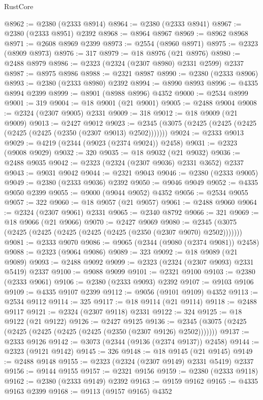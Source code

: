 \begin{lexlean}{RustCore}
\begin{coremodule}
@8962 := @2380 (@2333 @8914)
@8964 := @2380 (@2333 @8941)
@8967 := @2380 (@2333 @8951) @2392
@8968 := @8964 @8967
@8969 := @8962 @8968
@8971 := @2608 @8969 @2399
@8973 := @2554 (@8960 @8971)
@8975 := @2323 (@8909 @8973)
@8976 := 317
@8979 := @18 @8976 (@21 @8976)
@8980 := @2488 @8979
@8986 := @2323 (@2324 (@2307 @8980) @2331 @2599) @2337
@8987 := @8975 @8986
@8988 := @2321 @8987
@8990 := @2380 (@2333 @8906)
@8993 := @2380 (@2333 @8980) @2392
@8994 := @8990 @8993
@8996 := @4335 @8994 @2399
@8999 := @8901 (@8988 @8996) @4352
@9000 := @2534 @8999
@9001 := 319
@9004 := @18 @9001 (@21 @9001)
@9005 := @2488 @9004
@9008 := @2324 (@2307 @9005) @2331
@9009 := 318
@9012 := @18 @9009 (@21 @9009)
@9013 := @2427 @9012
@9023 := @2345 (@3075 (@2425 (@2425 (@2425 (@2425 (@2425 (@2350 (@2307 @9013) @2502)))))))
@9024 := @2333 @9013
@9029 := @4219 (@2344 (@9023 (@2374 @9024)) @2458)
@9031 := @2323 (@9008 @9029)
@9032 := 320
@9035 := @18 @9032 (@21 @9032)
@9036 := @2488 @9035
@9042 := @2323 (@2324 (@2307 @9036) @2331 @3652) @2337
@9043 := @9031 @9042
@9044 := @2321 @9043
@9046 := @2380 (@2333 @9005)
@9049 := @2380 (@2333 @9036) @2392
@9050 := @9046 @9049
@9052 := @4335 @9050 @2399
@9055 := @9000 (@9044 @9052) @4352
@9056 := @2534 @9055
@9057 := 322
@9060 := @18 @9057 (@21 @9057)
@9061 := @2488 @9060
@9064 := @2324 (@2307 @9061) @2331
@9065 := @2340 @8792
@9066 := 321
@9069 := @18 @9066 (@21 @9066)
@9070 := @2427 @9069
@9080 := @2345 (@3075 (@2425 (@2425 (@2425 (@2425 (@2425 (@2350 (@2307 @9070) @2502)))))))
@9081 := @2333 @9070
@9086 := @9065 (@2344 (@9080 (@2374 @9081)) @2458)
@9088 := @2323 (@9064 @9086)
@9089 := 323
@9092 := @18 @9089 (@21 @9089)
@9093 := @2488 @9092
@9099 := @2323 (@2324 (@2307 @9093) @2331 @5419) @2337
@9100 := @9088 @9099
@9101 := @2321 @9100
@9103 := @2380 (@2333 @9061)
@9106 := @2380 (@2333 @9093) @2392
@9107 := @9103 @9106
@9109 := @4335 @9107 @2399
@9112 := @9056 (@9101 @9109) @4352
@9113 := @2534 @9112
@9114 := 325
@9117 := @18 @9114 (@21 @9114)
@9118 := @2488 @9117
@9121 := @2324 (@2307 @9118) @2331
@9122 := 324
@9125 := @18 @9122 (@21 @9122)
@9126 := @2427 @9125
@9136 := @2345 (@3075 (@2425 (@2425 (@2425 (@2425 (@2425 (@2350 (@2307 @9126) @2502)))))))
@9137 := @2333 @9126
@9142 := @3073 (@2344 (@9136 (@2374 @9137)) @2458)
@9144 := @2323 (@9121 @9142)
@9145 := 326
@9148 := @18 @9145 (@21 @9145)
@9149 := @2488 @9148
@9155 := @2323 (@2324 (@2307 @9149) @2331 @5419) @2337
@9156 := @9144 @9155
@9157 := @2321 @9156
@9159 := @2380 (@2333 @9118)
@9162 := @2380 (@2333 @9149) @2392
@9163 := @9159 @9162
@9165 := @4335 @9163 @2399
@9168 := @9113 (@9157 @9165) @4352

\end{coremodule}
\end{lexlean}
